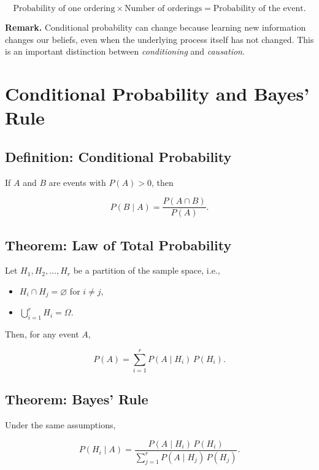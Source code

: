 \documentclass[12pt]{article}
\begin{document}
\[
\boxed{
\text{Probability of one ordering}
\times
\text{Number of orderings}
=
\text{Probability of the event}.
}
\]

\textbf{Remark.}
Conditional probability can change because learning new information changes
our beliefs, even when the underlying process itself has not changed.
This is an important distinction between \emph{conditioning} and
\emph{causation}.

\section{Conditional Probability and Bayes' Rule}

\subsection*{Definition: Conditional Probability}

If $A$ and $B$ are events with $P(A)>0$, then

\[
P(B\mid A)=\frac{P(A\cap B)}{P(A)}.
\]

\vspace{0.5em}

\subsection*{Theorem: Law of Total Probability}

Let $H_1,H_2,\ldots,H_r$ be a partition of the sample space, i.e.,
\begin{itemize}
    \item $H_i\cap H_j=\varnothing$ for $i\neq j$,
    \item $\displaystyle \bigcup_{i=1}^r H_i=\Omega$.
\end{itemize}

Then, for any event $A$,

\[
P(A)=\sum_{i=1}^{r} P(A\mid H_i)\,P(H_i).
\]

\vspace{0.5em}

\subsection*{Theorem: Bayes' Rule}

Under the same assumptions,

\[
P(H_i\mid A)
=
\frac{P(A\mid H_i)\,P(H_i)}
{\displaystyle\sum_{j=1}^{r} P(A\mid H_j)\,P(H_j)}.
\]

\vspace{0.5em}
\end{document}
